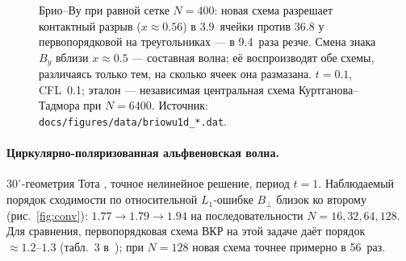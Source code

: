 \documentclass[12pt,a4paper]{article}
\newcommand{\code}[1]{\texttt{#1}}
\begin{document}
\begin{figure}[htbp]\centering
{}
\caption{Брио--Ву при равной сетке $N=400$: новая схема разрешает контактный
разрыв ($x\approx0.56$) в 3.9~ячейки против 36.8 у первопорядковой на
треугольниках --- в 9.4~раза резче. Смена знака $B_y$ вблизи $x\approx0.5$ ---
составная волна; её воспроизводят обе схемы, различаясь только тем, на сколько
ячеек она размазана. $t=0.1$, CFL~0.1; эталон --- независимая центральная схема
Куртганова--Тадмора при $N=6400$.
Источник: \code{docs/figures/data/briowu1d\_*.dat}.}
\label{fig:briowu}
\end{figure}

\paragraph{Циркулярно-поляризованная альфвеновская волна.}
$30^\circ$-геометрия Тота \cite{toth2000}, точное нелинейное решение, период
$t=1$. Наблюдаемый порядок сходимости по относительной $L_1$-ошибке $B_\perp$
близок ко второму (рис.~\ref{fig:conv}): $1.77\to1.79\to1.94$ на
последовательности $N=16,32,64,128$. Для сравнения, первопорядковая схема ВКР
на этой задаче даёт порядок $\approx1.2\text{--}1.3$ (табл.~3
в~\cite{shamanov2025}); при $N=128$ новая схема точнее примерно в 56~раз.
\end{document}

